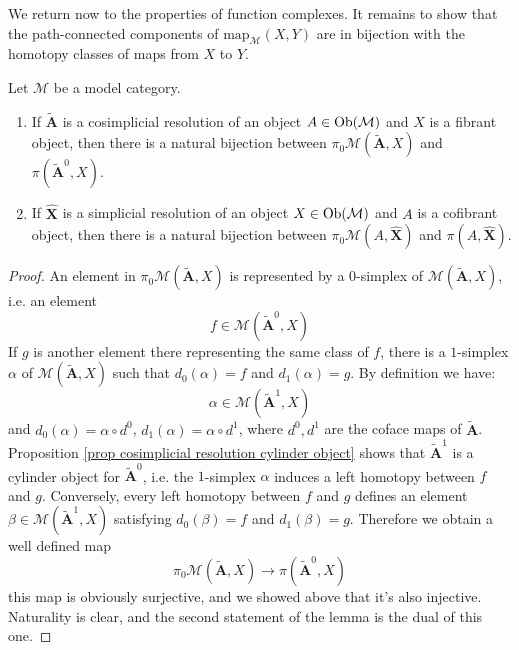 We return now to the properties of function complexes. It remains to show that the path-connected components of $\mathrm{map}_{\mathcal M}(X,Y)$ are in bijection with the homotopy classes of maps from $X$ to $Y$.

\begin{lemma} \label{lemma path component function complexes}
Let $\mathcal M$ be a model category.
\begin{enumerate}
\item If $\widetilde{\mathbf A}$ is a cosimplicial resolution of an object $A \in \mathrm{Ob}(\mathcal M)$ and $X$ is a fibrant object, then there is a natural bijection between $\pi_0 \mathcal M( \widetilde{\mathbf A}, X)$ and $\pi(\widetilde{\mathbf A}^0, X)$.
\item If $\widehat{\mathbf X}$ is a simplicial resolution of an object $X \in \mathrm{Ob}(\mathcal M)$ and $A$ is a cofibrant object, then there is a natural bijection between $\pi_0 \mathcal M(A, \widehat{\mathbf X})$ and $\pi(A, \widehat{\mathbf X})$.
\end{enumerate}
\end{lemma}

\begin{proof}
An element in $\pi_0 \mathcal M(\widetilde{\mathbf A},X)$ is represented by a $0$-simplex of $\mathcal M(\widetilde{\mathbf A},X)$, i.e. an element
\[
f \in \mathcal M (\widetilde{\mathbf A}^0, X)
\]
If $g$ is another element there representing the same class of $f$, there is a $1$-simplex $\alpha$ of $\mathcal M(\widetilde{\mathbf A}, X)$ such that $d_0(\alpha) = f$ and $d_1(\alpha) = g$. By definition we have:
\[
\alpha \in \mathcal M(\widetilde{\mathbf A}^1, X)
\]
and $d_0(\alpha) = \alpha \circ d^0$, $d_1(\alpha) = \alpha \circ d^1$, where $d^0,d^1$ are the coface maps of $\widetilde{\mathbf A}$. Proposition \ref{prop cosimplicial resolution cylinder object} shows that $\widetilde{\mathbf A}^1$ is a cylinder object for $\widetilde{\mathbf A}^0$, i.e. the $1$-simplex $\alpha$ induces a left homotopy between $f$ and $g$. Conversely, every left homotopy between $f$ and $g$ defines an element $\beta \in \mathcal M(\widetilde{\mathbf A}^1,X)$ satisfying $d_0(\beta) = f$ and $d_1(\beta) = g$. Therefore we obtain a well defined map
\[
\pi_0 \mathcal M(\widetilde{\mathbf A}, X) \to \pi(\widetilde{\mathbf A}^0,X)
\]
this map is obviously surjective, and we showed above that it's also injective. Naturality is clear, and the second statement of the lemma is the dual of this one.
\end{proof}

